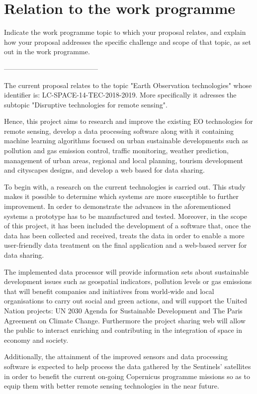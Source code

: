 \section{Relation to the work programme}

Indicate the work programme topic to which your proposal relates, and explain how your proposal addresses the specific challenge and scope of that topic, as set out in the work programme.

-----------------------------------------

The current proposal relates to the topic "Earth Observation technologies" whose identifier is: LC-SPACE-14-TEC-2018-2019. More specifically it adresses the subtopic "Disruptive technologies for remote sensing". 

Hence, this project aims to research and improve the existing EO technologies for remote sensing, develop a data processing software along with it containing machine learning algorithms focused on urban sustainable developments such as pollution and gas emission control, traffic monitoring, weather prediction, management of urban areas, regional and local planning, tourism development and cityscapes designs, and develop a web based for data sharing. 

To begin with, a research on the current technologies is carried out. This study makes it possible to determine which systems are more susceptible to further improvement. In order to demonstrate the advances in the aforementioned systems a prototype has to be manufactured and tested. Moreover, in the scope of this project, it has been included the development of a software that, once the data has been collected and received, treats the data in order to enable a more user-friendly data treatment on the final application and a web-based server for data sharing.

The implemented data processor will provide information sets about sustainable development issues such as geospatial indicators, pollution levels or gas emissions that will benefit companies and initiatives from world-wide and local organisations to carry out social and green actions, and will support the United Nation projects: UN 2030 Agenda for Sustainable Development and The Paris Agreement on Climate Change. Furthermore the project sharing web will allow the public to interact enriching and contributing in the integration of space in economy and society.
 
Additionally, the attainment of the improved sensors and data processing software is expected to help process the data gathered by the Sentinels' satellites in order to benefit the current on-going Copernicus programme missions so as to equip them with better remote sensing technologies in the near future.  